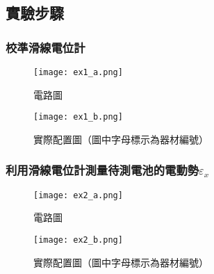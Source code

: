 \documentclass[12pt]{article}
\begin{document}
        \subsection{實驗步驟}
            
        \subsubsection{校準滑線電位計}
        \label{sssec:ex1}

        \begin{figure}[h]
            \begin{minipage}{0.34\textwidth}
                \centering
                \texttt{[image: ex1\_a.png]}
                \caption{電路圖}
                \label{fig:ex1_a}
            \end{minipage}
            \begin{minipage}{0.65\textwidth}
                \centering
                \texttt{[image: ex1\_b.png]}
                \caption{實際配置圖（圖中字母標示為器材編號）}
                \label{fig:ex1_b}
            \end{minipage}
        \end{figure}

        \begin{center}
        \end{center}
            
        \subsubsection{利用滑線電位計測量待測電池的電動勢$\varepsilon_x$}

        \quad

        \begin{figure}[h]
            \begin{minipage}{0.34\textwidth}
                \centering
                \texttt{[image: ex2\_a.png]}
                \caption{電路圖}
                \label{fig:ex2_a}
            \end{minipage}
            \begin{minipage}{0.65\textwidth}
                \centering
                \texttt{[image: ex2\_b.png]}
                \caption{實際配置圖（圖中字母標示為器材編號）}
                \label{fig:ex2_b}
            \end{minipage}
        \end{figure}
\end{document}
